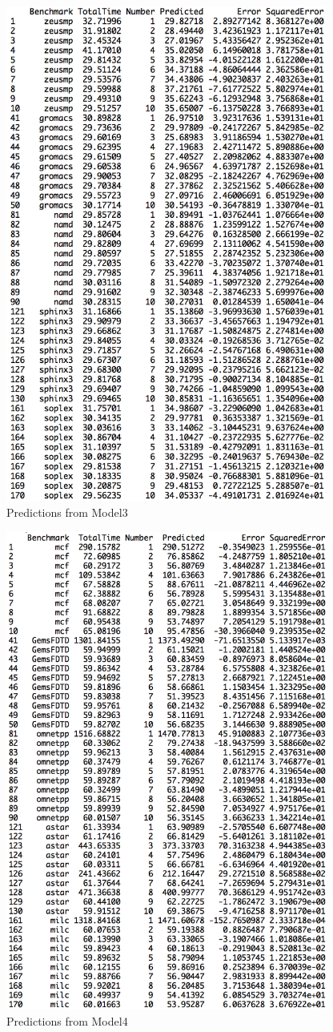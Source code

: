 \documentclass[a4paper,10pt,twoside]{article}
\begin{document}
\begin{figure}[h]
\centering
\includegraphics[width=400px]{pred3.png} 
\caption{Predictions from Model3}
\end{figure}
\begin{figure}[h]
\centering
\includegraphics[width=400px]{pred4.png} 
\caption{Predictions from Model4}
\end{figure}
\end{document}
